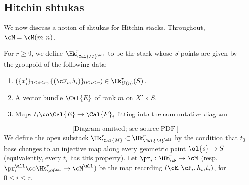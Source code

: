 

\subsection{Hitchin shtukas}\label{ssec: Hitchin shtukas}
We now discuss a notion of shtukas for Hitchin stacks. Throughout, $\cM = \cM(m,n)$.

\begin{defn}
\notready\label{defn: hitchin hecke}
For $r \geq 0$, we define $\Hk_{\Cal{M}^{\all}}^{r}$ to be the stack whose $S$-points are given by the groupoid of the following data:
\begin{enumerate}
\item $(\{x'_i\}_{1\le i\le r},\{(\cF_{i},h_{i})\}_{0\le i\le r})\in \Hk^{r}_{U(n)}(S)$.
\item A vector bundle $\Cal{E}$ of rank $m$ on $X' \times S$.
\item Maps $t_i \co \Cal{E} \rightarrow \Cal{F}_i$ fitting into the commutative diagram
\end{enumerate}
\[
\text{[Diagram omitted; see source PDF.]}
\]
We define the open substack $\Hk_{\Cal{M}}^{r} \subset \Hk_{\Cal{M}^{\all}}^{r}$ by the condition that $t_0 $ base changes to an injective map along every geometric point $\ol{s} \rightarrow S$ (equivalently, every $t_i$ has this property). Let $\pr_{i}: \Hk^{r}_{\cM}\to \cM$ (resp. $\pr_i^{\all} \co \Hk^r_{\cM^{\all}} \to \cM^{\all}$) be the map recording $(\cE, \cF_{i}, h_{i}, t_{i})$, for $0\le i\le r$.

\end{defn}



